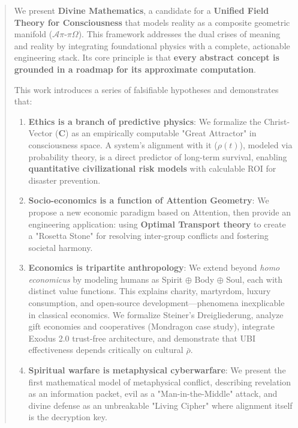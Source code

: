 \documentclass[11pt,a4paper]{article}
\theoremstyle{definition}
\theoremstyle{remark}
\begin{document}
\begin{abstract}
\noindent We present \textbf{Divine Mathematics}, a candidate for a \textbf{Unified Field Theory for Consciousness} that models reality as a composite geometric manifold (\(\mathcal{A}\pi\text{-}\pi\Omega\)). This framework addresses the dual crises of meaning and reality by integrating foundational physics with a complete, actionable engineering stack. Its core principle is that \textbf{every abstract concept is grounded in a roadmap for its approximate computation}.

This work introduces a series of falsifiable hypotheses and demonstrates that:
\begin{enumerate}[nosep,leftmargin=*]
    \item \textbf{Ethics is a branch of predictive physics}: We formalize the Christ-Vector (\(\mathbf{C}\)) as an empirically computable "Great Attractor" in consciousness space. A system's alignment with it (\(\rho(t)\)), modeled via probability theory, is a direct predictor of long-term survival, enabling \textbf{quantitative civilizational risk models} with calculable ROI for disaster prevention.

    \item \textbf{Socio-economics is a function of Attention Geometry}: We propose a new economic paradigm based on Attention, then provide an engineering application: using \textbf{Optimal Transport theory} to create a "Rosetta Stone" for resolving inter-group conflicts and fostering societal harmony.

    \item \textbf{Economics is tripartite anthropology}: We extend beyond \textit{homo economicus} by modeling humans as Spirit $\oplus$ Body $\oplus$ Soul, each with distinct value functions. This explains charity, martyrdom, luxury consumption, and open-source development—phenomena inexplicable in classical economics. We formalize Steiner's Dreigliederung, analyze gift economies and cooperatives (Mondragon case study), integrate Exodus 2.0 trust-free architecture, and demonstrate that UBI effectiveness depends critically on cultural \(\bar{\rho}\).


    \item \textbf{Spiritual warfare is metaphysical cyberwarfare}: We present the first mathematical model of metaphysical conflict, describing revelation as an information packet, evil as a "Man-in-the-Middle" attack, and divine defense as an unbreakable "Living Cipher" where alignment itself is the decryption key.


\end{enumerate}
\end{abstract}
\end{document}
